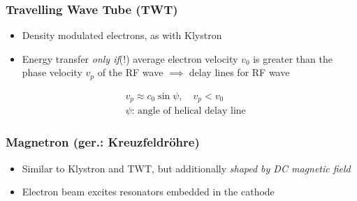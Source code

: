 \subsubsection{Travelling Wave Tube (TWT)}
\begin{itemize}
    \itemsep0pt
    \item Density modulated electrons, as with Klystron
    \item Energy transfer \textit{only if}(!) average electron velocity $v_0$ is greater than the phase velocity $v_p$ of the RF wave $\implies$ delay lines for RF wave
\end{itemize}
\begin{align*}
    &v_p \approx c_0 \sin \psi, \quad v_p < v_0\\
    &\psi\text{: angle of helical delay line}
\end{align*}

\subsubsection{Magnetron (ger.: Kreuzfeldröhre)}
\begin{itemize}
    \itemsep0pt
    \item Similar to Klystron and TWT, but additionally \textit{shaped by DC magnetic field}
    \item Electron beam excites resonators embedded in the cathode
\end{itemize}
